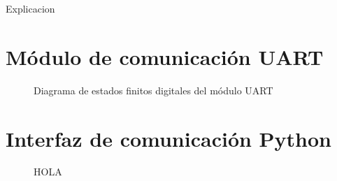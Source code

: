 		Explicacion 
		
\section{Módulo de comunicación UART}

		\begin{figure}[h]
		\centering
			\caption{Diagrama de estados finitos digitales del módulo UART}
			\label{fig:FSMD_UART}
		\end{figure}

\section{Interfaz de comunicación Python}

		\begin{figure}[h]
		\centering
			\caption{HOLA}
			\label{fig:hola}
		\end{figure}
